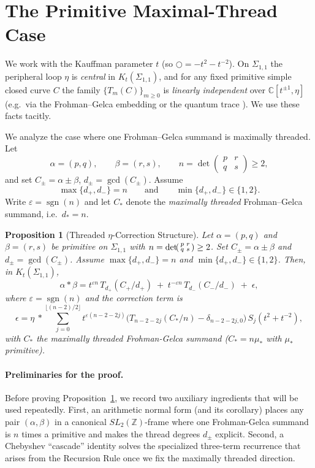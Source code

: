 \documentclass[12pt]{article}
\newtheorem{proposition}[theorem]{Proposition}
\begin{document}
\section{The Primitive Maximal-Thread Case}
\label{sec:max-thread}

We work with the Kauffman parameter $t$ (so $\bigcirc=-t^2-t^{-2}$). On $\Sigma_{1,1}$ the
peripheral loop $\eta$ is \emph{central} in $K_t(\Sigma_{1,1})$, and for any fixed primitive simple
closed curve $C$ the family $\{T_m(C)\}_{m\ge0}$ is \emph{linearly independent} over
$\mathbb{C}[t^{\pm1},\eta]$ (e.g.\ via the Frohman--Gelca embedding or the quantum trace \cite{frohmangelca,bonahonwong}). We use these facts tacitly.

We analyze the case where one Frohman--Gelca summand is maximally threaded. Let
\[
\alpha=(p,q),\qquad \beta=(r,s),\qquad n=\det\!\begin{pmatrix}p&r\\ q&s\end{pmatrix}\ge2,
\]
and set $C_\pm=\alpha\pm\beta$, $d_\pm=\gcd(C_\pm)$. Assume
\[
\max\{d_+,d_-\}=n\qquad\text{and}\qquad \min\{d_+,d_-\}\in\{1,2\}.
\]
Write $\varepsilon=\operatorname{sgn}(n)$ and let $C_\ast$ denote the \emph{maximally threaded}
Frohman--Gelca summand, i.e.\ $d_\ast=n$.



\begin{proposition}[Threaded $\eta$-Correction Structure]\label{prop:threaded}
Let $\alpha=(p,q)$ and $\beta=(r,s)$ be primitive on $\Sigma_{1,1}$ with
$n=\det\!\begin{psmallmatrix}p&r\\ q&s\end{psmallmatrix}\ge2$.
Set $C_{\pm}=\alpha\pm\beta$ and $d_{\pm}=\gcd(C_{\pm})$.
Assume $\max\{d_+,d_-\}=n$ and $\min\{d_+,d_-\}\in\{1,2\}$.
Then, in $K_t(\Sigma_{1,1})$,
\[
\alpha\ast\beta
= t^{\varepsilon n}\,T_{d_+}(C_+/d_+)\;+\;t^{-\varepsilon n}\,T_{d_-}(C_-/d_-)\;+\;\epsilon,
\]
where $\varepsilon=\operatorname{sgn}(n)$ and the correction term is
\[
\epsilon
= \eta\ \ast\sum_{j=0}^{\lfloor (n-2)/2\rfloor}
t^{\varepsilon(n-2-2j)}\Big(T_{n-2-2j}(C_\ast/n)-\delta_{n-2-2j,0}\Big)\,S_j(t^2+t^{-2}),
\]
with $C_\ast$ the maximally threaded Frohman-Gelca summand ($C_\ast=n\mu_\ast$ with $\mu_\ast$ primitive).
\end{proposition}



\paragraph{Preliminaries for the proof.}
Before proving Proposition~\ref{prop:threaded}, we record two auxiliary ingredients that will be
used repeatedly. First, an arithmetic normal form (and its corollary) places any pair
$(\alpha,\beta)$ in a canonical $SL_2(\mathbb Z)$-frame where one Frohman-Gelca summand is $n$
times a primitive and makes the thread degrees $d_\pm$ explicit. Second, a Chebyshev
``cascade'' identity solves the specialized three-term recurrence that arises from the
Recursion Rule once we fix the maximally threaded direction.
\end{document}
